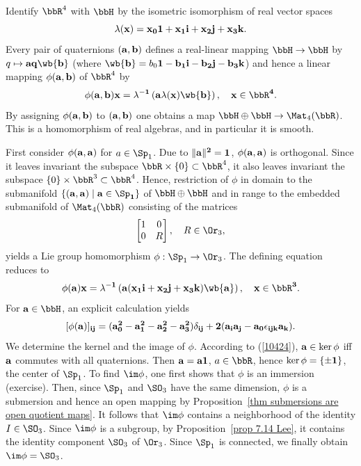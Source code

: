 \begin{example}\label{example universal covering groups of so3 and so4}
    Identify $\bbR^4$ with $\bbH$ by the isometric isomorphism of real vector spaces
    \[\lambda(\bf{x})=x_0\bf{1}+x_1 \bf{i}+x_2 \bf{j}+x_3 \bf{k}.\]
    Every pair of quaternions $(\bf{a},\bf{b})$ defines a real-linear mapping $\bbH\to \bbH$ by $q\mapsto \bf{a}q\wb{\bf{b}}$ (where $\wb{\bf{b}}=b_0 \bf{1}-b_1\bf{i}-b_2\bf{j}-b_3\bf{k}$) and hence a linear mapping $\phi(\bf{a},\bf{b})$ of $\bbR^4$ by
    \[\phi(\bf{a},\bf{b})x=\lambda^{-1}\left(\bf{a}\lambda(x)\wb{\bf{b}}\right),\quad x\in\bbR^4.\label{10423}\]
    By assigning $\phi(\bf{a},\bf{b})$ to $(\bf{a},\bf{b})$ one obtains a map $\bbH\oplus\bbH\to \Mat_4(\bbR)$. This is a homomorphism of real algebras, and in particular it is smooth.

    First consider $\phi(\bf{a},\bf{a})$ for $a\in\Sp_1$. Due to $\lVert \bf{a}\rVert^2=1$, $\phi(\bf{a},\bf{a})$ is orthogonal. Since it leaves invariant the subspace $\bbR\times\{0\}\subset\bbR^4$, it also leaves invariant the subspace $\{0\}\times\bbR^3\subset\bbR^4$. Hence, restriction of $\phi$ in domain to the submanifold $\{(\bf{a},\bf{a})\mid \bf{a}\in\Sp_1\}$ of $\bbH\oplus\bbH$ and in range to the embedded submanifold of $\Mat_4(\bbR)$ consisting of the matrices
    \[\begin{bmatrix}
        1&0\\0&R
    \end{bmatrix},\quad R\in\Or_3,\]
    yields a Lie group homomorphism $\phi:\Sp_1\to \Or_3$. The defining equation reduces to
    \[\phi(\bf{a})x=\lambda^{-1}\left(\bf{a}(x_1\bf{i}+x_2\bf{j}+x_3\bf{k})\wb{\bf{a}}\right),\quad x\in\bbR^3.\label{10424}\]
    For $\bf{a}\in\bbH$, an explicit calculation yields
    \[[\phi(\bf{a})]_{ij}=(a_0^2-a_1^2-a_2^2-a_3^2)\delta_{ij}+2(a_i a_j-a_0\epsilon_{ijk}a_k).\]
    We determine the kernel and the image of $\phi$. According to (\ref{10424}), $\bf{a}\in\ker\phi$ iff $\bf{a}$ commutes with all quaternions. Then $\bf{a}=a\bf{1}$, $a\in\bbR$, hence $\ker\phi=\{\pm \bf{1}\}$, the center of $\Sp_1$. To find $\im\phi$, one first shows that $\phi$ is an immersion (exercise). Then, since $\Sp_1$ and $\SO_3$ have the same dimension, $\phi$ is a submersion and hence an open mapping by Proposition~\ref{thm submersions are open quotient maps}. It follows that $\im\phi$ contains a neighborhood of the identity $I\in\SO_3$. Since $\im\phi$ is a subgroup, by Proposition~\ref{prop 7.14 Lee}, it contains the identity component $\SO_3$ of $\Or_3$. Since $\Sp_1$ is connected, we finally obtain $\im\phi=\SO_3$.


\end{example}
